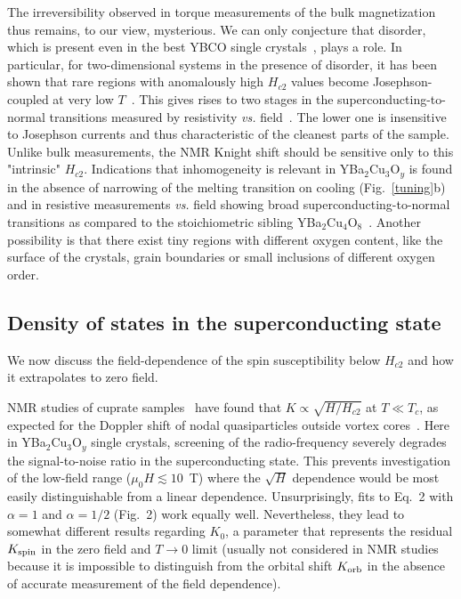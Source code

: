 \documentclass[superscriptaddress,twocolumn,prl,preprintnumbers,amsmath,amssymb]{revtex4}
\begin{document}
The irreversibility observed in torque measurements of the bulk magnetization thus remains, to our view, mysterious. We can only conjecture that disorder, which is present even in the best YBCO single crystals~\cite{Wu16}, plays a role. In particular, for two-dimensional systems in the presence of disorder, it has been shown that rare regions with anomalously high $H_{c2}$ values become Josephson-coupled at very low $T$~\cite{Spivak,Gafilms,Lesueur,Popovic}. This gives rises to two stages in the superconducting-to-normal transitions measured by resistivity {\it vs.} field~\cite{Spivak,Gafilms,Lesueur,Popovic}. The lower one is insensitive to Josephson currents and thus characteristic of the cleanest parts of the sample. Unlike bulk measurements, the NMR Knight shift should be sensitive only to this "intrinsic" $H_{c2}$. Indications that inhomogeneity is relevant in YBa$_2$Cu$_3$O$_y$ is found in the absence of narrowing of the melting transition on cooling (Fig.~\ref{tuning}b) and in resistive measurements  {\it vs.} field showing broad superconducting-to-normal transitions as compared to the stoichiometric sibling YBa$_2$Cu$_4$O$_8$~\cite{LeBoeuf07}. Another possibility is that there exist tiny regions with different oxygen content, like the surface of the crystals, grain boundaries or small inclusions of different oxygen order.



\subsection*{Density of states in the superconducting state}

We now discuss the field-dependence of the spin susceptibility below $H_{c2}$ and how it extrapolates to zero field.

NMR studies of cuprate samples~\cite{Zheng02,Kawasaki10} have found that $K \propto \sqrt{H/H_{c2}}$ at $T\ll T_c$, as expected for the Doppler shift of nodal quasiparticles outside vortex cores~\cite{Volovik}. Here in YBa$_2$Cu$_3$O$_y$ single crystals, screening of the radio-frequency severely degrades the signal-to-noise ratio in the superconducting state. This prevents investigation of the low-field range ($\mu_0 H \lesssim 10$~T) where the $\sqrt{H}$ dependence would be most easily distinguishable from a linear dependence. Unsurprisingly, fits to Eq.~2 with $\alpha=1$ and $\alpha=1/2$ (Fig.~2) work equally well. Nevertheless, they lead to somewhat different results regarding $K_0$, a parameter that represents the residual $K_{\rm spin}$ in the zero field and $T\rightarrow 0$ limit (usually not considered in NMR studies because it is impossible to distinguish from the orbital shift $K_{\rm orb}$ in the absence of accurate measurement of the field dependence).
\end{document}
